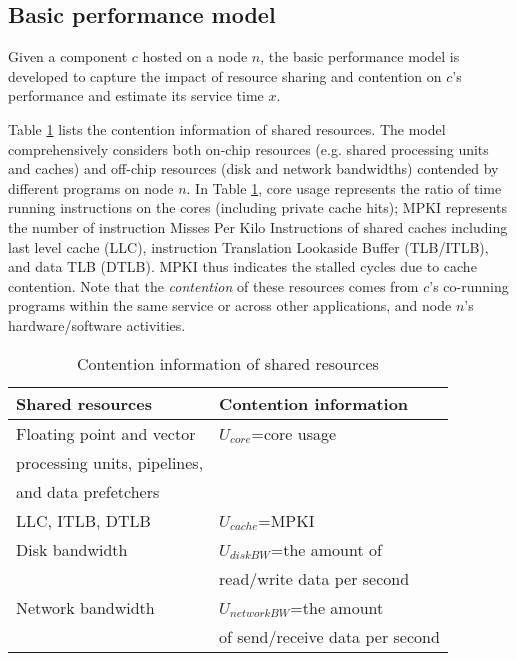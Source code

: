 \documentclass[10pt, conference, compsocconf]{IEEEtran}
\begin{document}
\subsection{Basic performance model} \label{Section: Basic performance model}

Given a component $c$ hosted on a node $n$, the basic performance model is developed to capture the impact of resource sharing and contention on $c$'s performance and estimate its service time $x$.

Table \ref{table: Usage information of shared resources} lists the contention information of shared resources. The model comprehensively considers both on-chip resources (e.g. shared processing units and caches) and off-chip resources (disk and network bandwidths) contended by different programs on node $n$. In Table \ref{table: Usage information of shared resources}, core usage represents the ratio of time running instructions on the cores (including private cache hits); MPKI represents the number of instruction Misses Per Kilo Instructions of shared caches including last level cache (LLC), instruction Translation Lookaside Buffer (TLB/ITLB), and data TLB (DTLB). MPKI thus indicates the stalled cycles due to cache contention. Note that the \emph{contention} of these resources comes from $c$'s co-running programs within the same service or across other applications, and node $n$'s hardware/software activities.















\begin{table}[h!]
  \caption{Contention information of shared resources}
  \centering
  \begin{tabular}{|l|l|}
    \hline
    \textbf{Shared resources} & \textbf{Contention information} \\
    \hline
    Floating point and vector  & $U_{core}$=core usage\\
    processing units, pipelines,& \\
    and data prefetchers & \\
    \hline
    LLC, ITLB, DTLB & $U_{cache}$=MPKI\\
    \hline
    Disk bandwidth & $U_{diskBW}$=the amount of \\
    & read/write data per second \\
    \hline
    Network bandwidth & $U_{networkBW}$=the amount \\
    & of send/receive data per second  \\
    \hline
  \end{tabular}
  \label{table: Usage information of shared resources}
\end{table}
\end{document}
